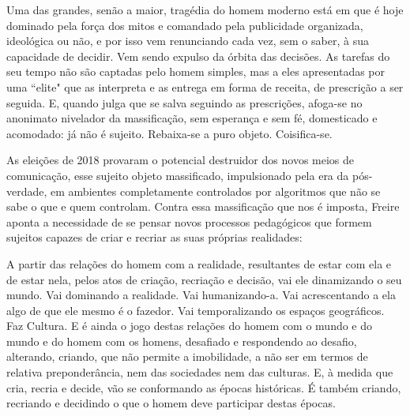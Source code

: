 

\begin{citacao}
Uma das grandes, senão a maior, tragédia do homem moderno está em que é hoje dominado pela força dos mitos e comandado pela publicidade organizada, ideológica ou não, e por isso vem renunciando cada vez, sem o saber, à sua capacidade de decidir. Vem sendo expulso da órbita das decisões. As tarefas do seu tempo não são captadas pelo homem simples, mas a eles apresentadas por uma ``elite" que as interpreta e as entrega em forma de receita, de prescrição a ser seguida. E, quando julga que se salva seguindo as prescrições, afoga-se no anonimato nivelador da massificação, sem esperança e sem fé, domesticado e acomodado: já não é sujeito. Rebaixa-se a puro objeto. Coisifica-se. \cite[60]{Freire2015}
\end{citacao} 


As eleições de 2018 provaram o potencial destruidor dos novos meios de comunicação, esse sujeito objeto massificado, impulsionado pela era da pós-verdade, em ambientes completamente controlados por algoritmos que não se sabe o que e quem controlam. Contra essa massificação que nos é imposta, Freire \citeyear{Freire2015} aponta a necessidade de se pensar novos processos pedagógicos que formem sujeitos capazes de criar e recriar as suas próprias realidades: 

\begin{citacao}
A partir das relações do homem com a realidade, resultantes de estar com ela e de estar nela, pelos atos de criação, recriação e decisão, vai ele dinamizando o seu mundo. Vai dominando a realidade. Vai humanizando-a. Vai acrescentando a ela algo de que ele mesmo é o fazedor. Vai temporalizando os espaços geográficos. Faz Cultura. E é ainda o jogo destas relações do homem com o mundo e do mundo e do homem com os homens, desafiado e respondendo ao desafio, alterando, criando, que não permite a imobilidade, a não ser em termos de relativa preponderância, nem das sociedades nem das culturas. E, à medida que cria, recria e decide, vão se conformando as épocas históricas. É também criando, recriando e decidindo o que o homem deve participar destas épocas. \cite[p. 60]{Freire2015}
\end{citacao} 


